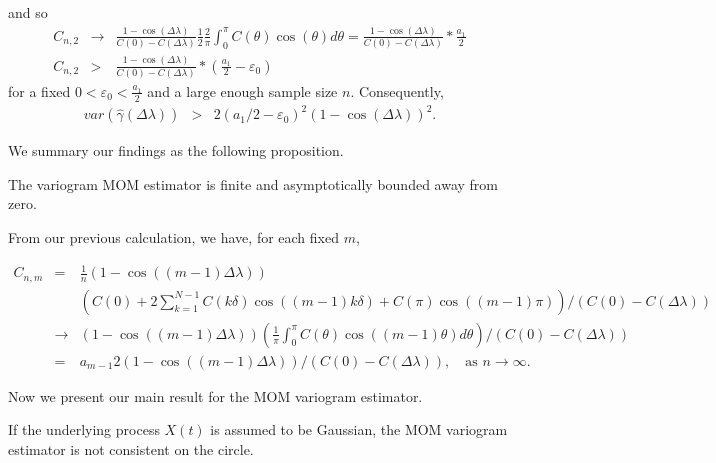 and so
\begin{eqnarray*}
C_{n, 2} &\to& \frac{1 - \cos(\Delta \lambda)}{C(0) - C(\Delta \lambda)} \frac{1}{2} \frac{2}{\pi}\int_0^\pi C(\theta)\cos(\theta)d\theta = \frac{1 - \cos(\Delta \lambda)}{C(0) - C(\Delta \lambda)}*\frac{a_1}{2} \\
C_{n, 2} &>& \frac{1 - \cos(\Delta \lambda)}{C(0) - C(\Delta \lambda)}*(\frac{a_1}{2} - \varepsilon_0)
\end{eqnarray*}
for a fixed $0 < \varepsilon_0 < \frac{a_1}{2}$ and a large enough sample size $n$. Consequently,
\begin{eqnarray*}
var(\hat{\gamma}(\Delta \lambda)) &>& 2(a_1/2 - \varepsilon_0)^2(1 - \cos(\Delta \lambda))^2.
\end{eqnarray*}

We summary our findings as the following proposition. \\

\begin{prop}
The variogram MOM estimator is finite and asymptotically bounded away from zero.
\end{prop}

From our previous calculation, we have, for each fixed $m$,

\begin{eqnarray*}
C_{n, m} &=& \frac{1}{n}(1 - \cos((m-1)\Delta \lambda)) \\
& &\left(C(0) + 2\sum_{k = 1}^{N-1}C(k\delta)\cos((m-1)k\delta) + C(\pi)\cos((m-1)\pi)\right)/(C(0)-C(\Delta \lambda)) \\
& \to & (1 - \cos((m-1)\Delta \lambda)) \left(\frac{1}{\pi}\int_0^\pi C(\theta)\cos((m-1)\theta)d\theta\right)/(C(0)-C(\Delta \lambda)) \\
&=& {a_{m-1}}{2}(1 - \cos((m-1)\Delta \lambda))/(C(0)-C(\Delta \lambda)), \quad \mbox{as $n \to \infty$.}
\end{eqnarray*}

Now we present our main result for the MOM variogram estimator.

\begin{prop}
If the underlying process $X(t)$ is assumed to be Gaussian, the MOM variogram estimator is not consistent on the circle.
\end{prop}

